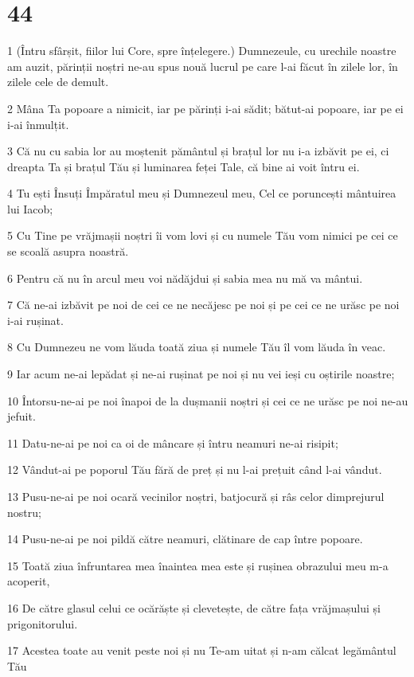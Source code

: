 \chapter{44}

\par 1 (Întru sfârșit, fiilor lui Core, spre înțelegere.) Dumnezeule, cu urechile noastre am auzit, părinții noștri ne-au spus nouă lucrul pe care l-ai făcut în zilele lor, în zilele cele de demult.
\par 2 Mâna Ta popoare a nimicit, iar pe părinți i-ai sădit; bătut-ai popoare, iar pe ei i-ai înmulțit.
\par 3 Că nu cu sabia lor au moștenit pământul și brațul lor nu i-a izbăvit pe ei, ci dreapta Ta și brațul Tău și luminarea feței Tale, că bine ai voit întru ei.
\par 4 Tu ești Însuți Împăratul meu și Dumnezeul meu, Cel ce poruncești mântuirea lui Iacob;
\par 5 Cu Tine pe vrăjmașii noștri îi vom lovi și cu numele Tău vom nimici pe cei ce se scoală asupra noastră.
\par 6 Pentru că nu în arcul meu voi nădăjdui și sabia mea nu mă va mântui.
\par 7 Că ne-ai izbăvit pe noi de cei ce ne necăjesc pe noi și pe cei ce ne urăsc pe noi i-ai rușinat.
\par 8 Cu Dumnezeu ne vom lăuda toată ziua și numele Tău îl vom lăuda în veac.
\par 9 Iar acum ne-ai lepădat și ne-ai rușinat pe noi și nu vei ieși cu oștirile noastre;
\par 10 Întorsu-ne-ai pe noi înapoi de la dușmanii noștri și cei ce ne urăsc pe noi ne-au jefuit.
\par 11 Datu-ne-ai pe noi ca oi de mâncare și întru neamuri ne-ai risipit;
\par 12 Vândut-ai pe poporul Tău fără de preț și nu l-ai prețuit când l-ai vândut.
\par 13 Pusu-ne-ai pe noi ocară vecinilor noștri, batjocură și râs celor dimprejurul nostru;
\par 14 Pusu-ne-ai pe noi pildă către neamuri, clătinare de cap între popoare.
\par 15 Toată ziua înfruntarea mea înaintea mea este și rușinea obrazului meu m-a acoperit,
\par 16 De către glasul celui ce ocărăște și clevetește, de către fața vrăjmașului și prigonitorului.
\par 17 Acestea toate au venit peste noi și nu Te-am uitat și n-am călcat legământul Tău
